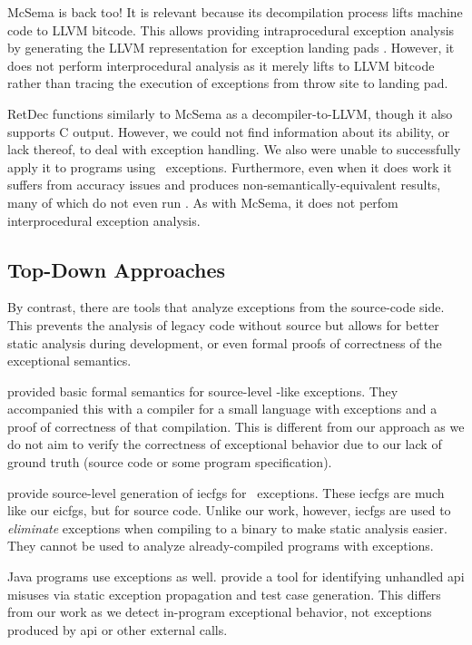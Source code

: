 McSema \autocite{mcsema} is back too! It is relevant because its decompilation process lifts machine code to LLVM bitcode.
This allows providing intraprocedural exception analysis by generating the LLVM representation for exception landing pads \autocite{mcsema-exceptions}.
However, it does not perform interprocedural analysis as it merely lifts to LLVM bitcode rather than tracing the execution of exceptions from throw site to landing pad.

RetDec \autocite{retdec} functions similarly to McSema as a decompiler-to-LLVM, though it also supports C output.
However, we could not find information about its ability, or lack thereof, to deal with exception handling. We also were unable to successfully apply it to programs using \Cpp\ exceptions.
Furthermore, even when it does work it suffers from accuracy issues and produces non-semantically-equivalent results, many of which do not even run \autocite{foudree2019regsym}.
As with McSema, it does not perfom interprocedural exception analysis.

\subsection{Top-Down Approaches}
By contrast, there are tools that analyze exceptions from the source-code side.
This prevents the analysis of legacy code without source but allows for better static analysis during development, or even formal proofs of correctness of the exceptional semantics.

\Textcite{hutton2004compiling} provided basic formal semantics for source-level \Cpp-like exceptions.
They accompanied this with a compiler for a small language with exceptions and a proof of correctness of that compilation.
This is different from our approach as we do not aim to verify the correctness of exceptional behavior due to our lack of ground truth (source code or some program specification).

\Textcite{prabhu2011interprocedural} provide source-level generation of \acp{iecfg} for \Cpp\ exceptions.
These \acp{iecfg} are much like our \acp{eicfg}, but for source code.
Unlike our work, however, \acp{iecfg} are used to \emph{eliminate} exceptions when compiling to a binary to make static analysis easier.
They cannot be used to analyze already-compiled programs with exceptions.

Java programs use exceptions as well. \Textcite{kechagia2019misuse} provide a tool for identifying unhandled \ac{api} misuses via static exception propagation and test case generation. This differs from our work as we detect in-program exceptional behavior, not exceptions produced by \ac{api} or other external calls.

